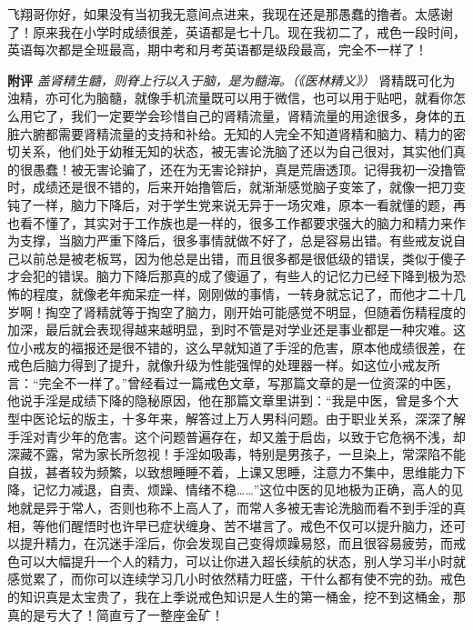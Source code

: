 \begin{case}
    飞翔哥你好，如果没有当初我无意间点进来，我现在还是那愚蠢的撸者。太感谢了！原来我在小学时成绩很差，英语都是七十几。现在我初二了，戒色一段时间，英语每次都是全班最高，期中考和月考英语都是级段最高，完全不一样了！

    \textbf{附评} \textit{盖肾精生髓，则脊上行以入于脑，是为髓海。（《医林精义》）} 肾精既可化为浊精，亦可化为脑髓，就像手机流量既可以用于微信，也可以用于贴吧，就看你怎么用它了，我们一定要学会珍惜自己的肾精流量，肾精流量的用途很多，身体的五脏六腑都需要肾精流量的支持和补给。无知的人完全不知道肾精和脑力、精力的密切关系，他们处于幼稚无知的状态，被无害论洗脑了还以为自己很对，其实他们真的很愚蠢！被无害论骗了，还在为无害论辩护，真是荒唐透顶。记得我初一没撸管时，成绩还是很不错的，后来开始撸管后，就渐渐感觉脑子变笨了，就像一把刀变钝了一样，脑力下降后，对于学生党来说无异于一场灾难，原本一看就懂的题，再也看不懂了，其实对于工作族也是一样的，很多工作都要求强大的脑力和精力来作为支撑，当脑力严重下降后，很多事情就做不好了，总是容易出错。有些戒友说自己以前总是被老板骂，因为他总是出错，而且很多都是很低级的错误，类似于傻子才会犯的错误。脑力下降后那真的成了傻逼了，有些人的记忆力已经下降到极为恐怖的程度，就像老年痴呆症一样，刚刚做的事情，一转身就忘记了，而他才二十几岁啊！掏空了肾精就等于掏空了脑力，刚开始可能感觉不明显，但随着伤精程度的加深，最后就会表现得越来越明显，到时不管是对学业还是事业都是一种灾难。这位小戒友的福报还是很不错的，这么早就知道了手淫的危害，原本他成绩很差，在戒色后脑力得到了提升，就像升级为性能强悍的处理器一样。如这位小戒友所言：“完全不一样了。”曾经看过一篇戒色文章，写那篇文章的是一位资深的中医，他说手淫是成绩下降的隐秘原因，他在那篇文章里讲到：“我是中医，曾是多个大型中医论坛的版主，十多年来，解答过上万人男科问题。由于职业关系，深深了解手淫对青少年的危害。这个问题普遍存在，却又羞于启齿，以致于它危祸不浅，却深藏不露，常为家长所忽视！手淫如吸毒，特别是男孩子，一旦染上，常深陷不能自拔，甚者较为频繁，以致想睡睡不着，上课又思睡，注意力不集中，思维能力下降，记忆力减退，自责、烦躁、情绪不稳……”这位中医的见地极为正确，高人的见地就是异于常人，否则也称不上高人了，而常人多被无害论洗脑而看不到手淫的真相，等他们醒悟时也许早已症状缠身、苦不堪言了。戒色不仅可以提升脑力，还可以提升精力，在沉迷手淫后，你会发现自己变得烦躁易怒，而且很容易疲劳，而戒色可以大幅提升一个人的精力，可以让你进入超长续航的状态，别人学习半小时就感觉累了，而你可以连续学习几小时依然精力旺盛，干什么都有使不完的劲。戒色的知识真是太宝贵了，我在上季说戒色知识是人生的第一桶金，挖不到这桶金，那真的是亏大了！简直亏了一整座金矿！
\end{case}

